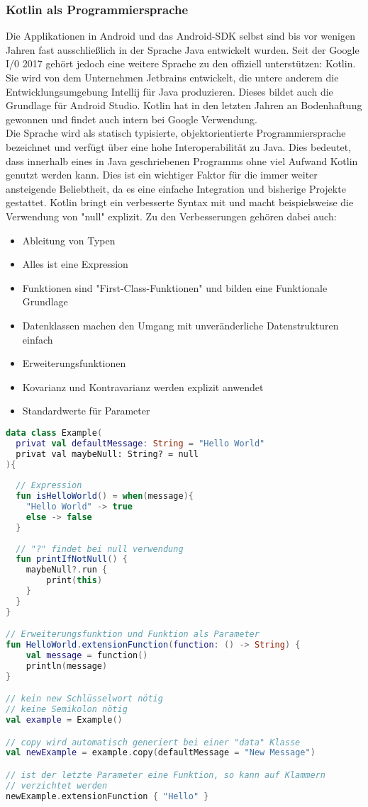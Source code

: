 \subsubsection{Kotlin als Programmiersprache}
Die Applikationen in Android und das Android-SDK selbst sind bis vor wenigen Jahren fast ausschließlich in der Sprache Java entwickelt wurden. Seit der Google I/0 2017 gehört jedoch eine weitere Sprache zu den offiziell unterstützen:  Kotlin. Sie wird von dem Unternehmen Jetbrains entwickelt, die untere anderem die Entwicklungsumgebung Intellij für Java produzieren. Dieses bildet auch die Grundlage für Android Studio.
Kotlin hat in den letzten Jahren an Bodenhaftung gewonnen und findet auch intern bei Google Verwendung.
\\
Die Sprache wird als statisch typisierte, objektorientierte Programmiersprache bezeichnet und verfügt über eine hohe Interoperabilität zu Java. Dies bedeutet, dass innerhalb eines in Java geschriebenen Programms ohne viel Aufwand Kotlin genutzt werden kann. Dies ist ein wichtiger Faktor für die immer weiter ansteigende Beliebtheit, da es eine einfache Integration und bisherige Projekte gestattet. 
Kotlin bringt ein verbesserte Syntax mit und macht beispielsweise die Verwendung von "null" explizit.
Zu den Verbesserungen gehören dabei auch:
\\
\begin{itemize}
	\item Ableitung von Typen
	\item Alles ist eine Expression 
	\item Funktionen sind "First-Class-Funktionen" und bilden eine Funktionale Grundlage
	\item Datenklassen machen den Umgang mit unveränderliche Datenstrukturen einfach
	\item Erweiterungsfunktionen
	\item Kovarianz und Kontravarianz werden explizit anwendet
	\item Standardwerte für Parameter
\end{itemize}
\bigskip
\begin{lstlisting}[caption={Kotlin Beispiel}, label={lst:kotlin-beispiel}, language=Kotlin]
data class Example(
  privat val defaultMessage: String = "Hello World"
  privat val maybeNull: String? = null
){
  
  // Expression
  fun isHelloWorld() = when(message){
    "Hello World" -> true
    else -> false
  }
  
  // "?" findet bei null verwendung
  fun printIfNotNull() {
    maybeNull?.run { 
    	print(this)
    }
  }
}

// Erweiterungsfunktion und Funktion als Parameter
fun HelloWorld.extensionFunction(function: () -> String) { 
	val message = function()
	println(message)
}

// kein new Schlüsselwort nötig
// keine Semikolon nötig
val example = Example()

// copy wird automatisch generiert bei einer "data" Klasse
val newExample = example.copy(defaultMessage = "New Message")

// ist der letzte Parameter eine Funktion, so kann auf Klammern 
// verzichtet werden
newExample.extensionFunction { "Hello" }
\end{lstlisting}
